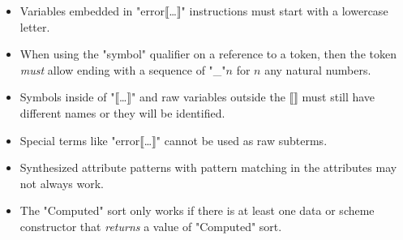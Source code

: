 \documentclass[12pt]{article} %
\begin{document}
\begin{itemize}
\item Variables embedded in "error⟦…⟧" instructions must start with a lowercase letter.

\item When using the "symbol" qualifier on a reference to a token, then the token \emph{must} allow
  ending with a sequence of "_"$n$ for $n$ any natural numbers.

\item Symbols inside of "⟦…⟧" and raw variables outside the ⟦⟧ must still have different names or
  they will be identified.

\item Special terms like "error⟦…⟧" cannot be used as raw subterms.

\item Synthesized attribute patterns with pattern matching in the attributes may not always work.

\item The "Computed" sort only works if there is at least one data or scheme constructor that
  \emph{returns} a value of "Computed" sort.

\end{itemize}



\end{document}
